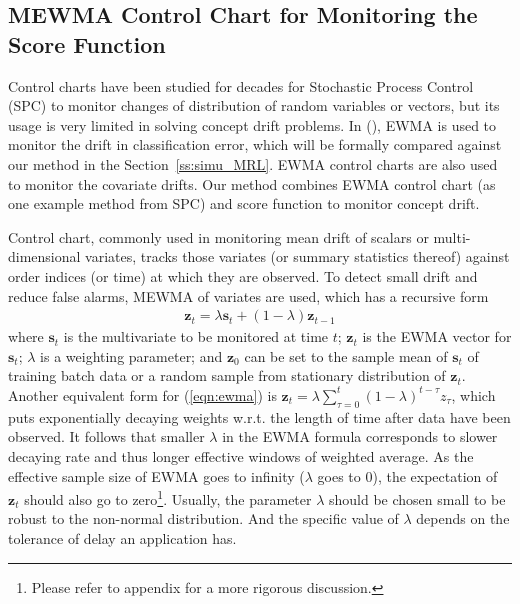 \documentclass[twoside,11pt]{article}
\begin{document}
\subsection{MEWMA Control Chart for Monitoring the Score Function}
\label{ss:MEWMA}
%

Control charts have been studied for decades for Stochastic Process Control (SPC) to monitor changes of distribution of random variables or vectors, but its usage is very limited in solving concept drift problems. In (\cite{ross2012exponentially}), EWMA is used to monitor the drift in classification error, which will be formally compared against our method in the Section~\ref{ss:simu_MRL}. EWMA control charts are also used to monitor the covariate drifts. Our method combines EWMA control chart (as one example method from SPC) and score function to monitor concept drift.

Control chart, commonly used in monitoring mean {drift} of scalars or multi-dimensional variates, tracks those variates (or summary statistics thereof) against order indices (or time) at which they are observed. To detect small {drift} and reduce false alarms, MEWMA of variates are used, which has a recursive form
\begin{align}
\bm {z}_t = \lambda \bm {s}_t + (1 - \lambda) \bm {z} _{t-1}
\label{eqn:ewma}
\end{align}
where $\bm {s}_t$ is the {multivariate} to be monitored at time $t$; {$\bm {z}_t$ is the EWMA vector for $\bm {s}_t$}; $ \lambda$ is a weighting parameter; and $\bm{z}_0$ can be set to the sample mean of $\bm {s}_t$ of training batch data or a random sample from stationary distribution of $\bm {z}_t$. Another equivalent form for (\ref{eqn:ewma}) is $\bm {z}_t = \lambda\sum _{\tau=0}^t (1-\lambda) ^{t-\tau} z _{\tau}$, which puts exponentially decaying weights w.r.t. the length of time after data have been observed. It follows that smaller $\lambda$ in the EWMA formula corresponds to slower decaying rate and thus longer effective windows of weighted average. As the effective sample size of EWMA goes to infinity ($ \lambda$ goes to $0$), the expectation of $\bm {z}_t$ should also go to zero\footnote{Please refer to appendix for a more rigorous discussion.}. Usually, the parameter $\lambda$ should be chosen small to be robust to the non-normal distribution. And the specific value of $\lambda$ depends on the tolerance of delay an application has.
\end{document}
